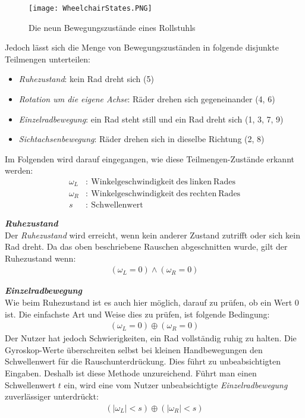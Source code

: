 \begin{figure}[h]
    \centering
    \texttt{[image: WheelchairStates.PNG]}
    \caption{Die neun Bewegungszustände eines Rollstuhls}
    \label{fig:wheelstates}
\end{figure}

Jedoch lässt sich die Menge von Bewegungszuständen in folgende disjunkte Teilmengen unterteilen:
\begin{itemize}
    \item \textit{Ruhezustand}: kein Rad dreht sich (5)
    \item \textit{Rotation um die eigene Achse}: Räder drehen sich gegeneinander (4, 6)
    \item \textit{Einzelradbewegung}: ein Rad steht still und ein Rad dreht sich (1, 3, 7, 9)
    \item \textit{Sichtachsenbewegung}: Räder drehen sich in dieselbe Richtung (2, 8)
\end{itemize}

Im Folgenden wird darauf eingegangen, wie diese Teilmengen-Zustände erkannt werden:
\begin{align}
    \omega_L & :\ \mathrm{Winkelgeschwindigkeit\ des\ linken\ Rades}  \\
    \omega_R & :\ \mathrm{Winkelgeschwindigkeit\ des\ rechten\ Rades} \\
    s        & :\ \mathrm{Schwellenwert}
\end{align}

\textbf{\textit{Ruhezustand}}\\
Der \textit{Ruhezustand} wird erreicht, wenn kein anderer Zustand zutrifft oder sich kein Rad dreht.
Da das oben beschriebene Rauschen abgeschnitten wurde, gilt der Ruhezustand wenn:
\begin{align}
    (\omega_L = 0) \land (\omega_R = 0)
\end{align}

\textbf{\textit{Einzelradbewegung}}\\
Wie beim Ruhezustand ist es auch hier möglich, darauf zu prüfen, ob ein Wert 0 ist.
Die einfachste Art und Weise dies zu prüfen, ist folgende Bedingung:
\begin{align}
    (\omega_L = 0) \oplus (\omega_R = 0)
\end{align}
Der Nutzer hat jedoch Schwierigkeiten, ein Rad vollständig ruhig zu halten.
Die Gyroskop-Werte überschreiten selbst bei kleinen Handbewegungen den Schwellenwert für die Rauschunterdrückung.
Dies führt zu unbeabsichtigten Eingaben.
Deshalb ist diese Methode unzureichend.
Führt man einen Schwellenwert $t$ ein, wird eine vom Nutzer unbeabsichtigte \textit{Einzelradbewegung} zuverlässiger unterdrückt:
\begin{align}
    (|\omega_L| < s) \oplus (|\omega_R| < s)
\end{align}


